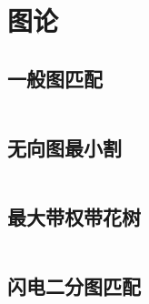 \chapter{图论}
\section{一般图匹配}
\inputminted{cpp}{\source/graph-theory/general-matching.cpp}
\section{无向图最小割}
\inputminted{cpp}{\source/graph-theory/StoerWagner_O(V^3).cpp}
\section{最大带权带花树}
\inputminted{cpp}{\source/graph-theory/weighted_blossom.cpp}
\section{闪电二分图匹配}
\inputminted{cpp}{\source/graph-theory/Hopcroft-Karp.cpp}